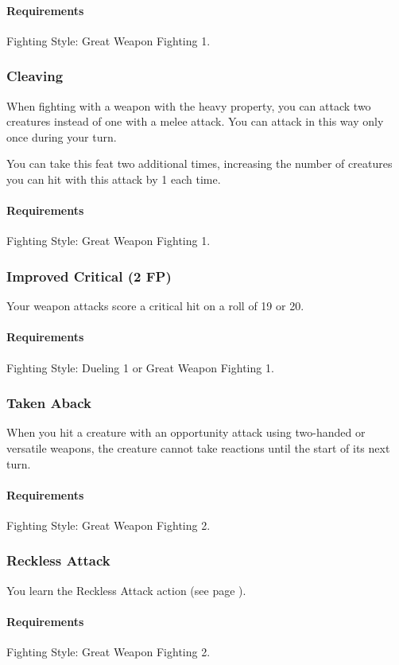     \paragraph{Requirements} Fighting Style: Great Weapon Fighting 1.
\subsubsection{Cleaving} \label{feat::cleaving}
    When fighting with a weapon with the heavy property, you can attack two creatures instead of one with a melee attack.
    You can attack in this way only once during your turn.

    You can take this feat two additional times, increasing the number of creatures you can hit with this attack by 1 each time.
    \paragraph{Requirements} Fighting Style: Great Weapon Fighting 1.
\subsubsection{Improved Critical (2 FP)} \label{feat::improvedcritical}
    Your weapon attacks score a critical hit on a roll of 19 or 20.
    \paragraph{Requirements} Fighting Style: Dueling 1 or Great Weapon Fighting 1.
\subsubsection{Taken Aback} \label{feat::takenaback}
    When you hit a creature with an opportunity attack using two-handed or versatile weapons, the creature cannot take reactions until the start of its next turn.
    \paragraph{Requirements} Fighting Style: Great Weapon Fighting 2.
\subsubsection{Reckless Attack} \label{feat::recklessattack}
    You learn the Reckless Attack action (see page \pageref{act::recklessattack}).
    \paragraph{Requirements} Fighting Style: Great Weapon Fighting 2.
